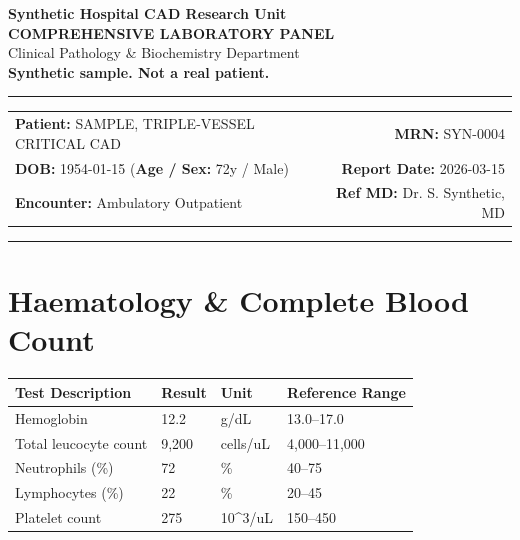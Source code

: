\documentclass[10pt,a4paper]{article}
\begin{document}
\begin{center}
  {\Large \textbf{Synthetic Hospital CAD Research Unit}}\\
  \vspace{2pt}
  {\normalsize \textbf{COMPREHENSIVE LABORATORY PANEL}}\\
  \vspace{1pt}
  {\footnotesize \textcolor{subtext}{Clinical Pathology \& Biochemistry Department}}\\
  \vspace{4pt}
  {\small \textbf{\textcolor{red!75!black}{Synthetic sample. Not a real patient.}}}\\
  \vspace{3pt}
  \textcolor{linecolor}{\rule{\textwidth}{0.8pt}}
\end{center}

\vspace{2pt}

\noindent
\begin{tabular*}{\textwidth}{@{} l @{\extracolsep{\fill}} r @{}}
  \textbf{Patient:} SAMPLE, TRIPLE-VESSEL CRITICAL CAD & \textbf{MRN:} SYN-0004 \\
  \textbf{DOB:} 1954-01-15 \quad (\textbf{Age / Sex:} 72y / Male) & \textbf{Report Date:} 2026-03-15 \\
  \textbf{Encounter:} Ambulatory Outpatient & \textbf{Ref MD:} Dr. S. Synthetic, MD \\
\end{tabular*}

\vspace{2pt}
\noindent\textcolor{linecolor}{\rule{\textwidth}{0.4pt}}
\vspace{6pt}


\section*{Haematology \& Complete Blood Count}

\begin{tabular}{@{} p{6.4cm} p{2.5cm} p{2.5cm} p{3.1cm} @{}}
  \toprule
  \textbf{Test Description} & \textbf{Result} & \textbf{Unit} & \textbf{Reference Range} \\
  \midrule
  Hemoglobin & 12.2 & g/dL & 13.0--17.0 \\
  Total leucocyte count & 9,200 & cells/uL & 4,000--11,000 \\
  Neutrophils (\%) & 72 & \% & 40--75 \\
  Lymphocytes (\%) & 22 & \% & 20--45 \\
  Platelet count & 275 & 10\textasciicircum 3/uL & 150--450 \\
  \bottomrule
\end{tabular}
\end{document}
